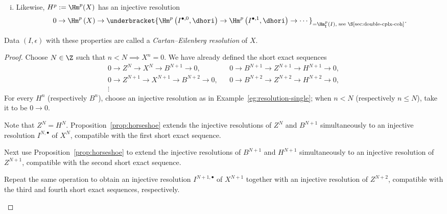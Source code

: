 \begin{theorem}
\begin{enumerate}[(i)]
		\[ 0 \to \Image\left( d_X^p \right) \to \Image\left( \dhori^{p, 0} \right) \to \Image\left( \dhori^{p, 1} \right) \to \cdots . \]
		\item Likewise, $H^p:=\Hm^p(X)$ has an injective resolution
		\[ 0 \to \Hm^p\left(X\right) \to \underbracket{\Hm^p\left( I^{\bullet, 0}, \dhori \right) \to \Hm^p\left( I^{\bullet, 1}, \dhori \right) \to \cdots}_{= \Hm^p_{\mathrm{I}}\left( I \right), \;\text{see \S\ref{sec:double-cplx-coh}} } . \]
	\end{enumerate}
	Data $(I,\epsilon)$ with these properties are called a
	\emph{Cartan--Eilenberg resolution} of $X$.
\end{theorem}
\begin{proof}
	Choose $N\in\Z$ such that $n<N\implies X^n=0$. We have already defined
	the short exact sequences
	\begin{align*}
		0 \to Z^N \to X^N \to B^{N+1} \to 0, & & 0 \to B^{N+1} \to Z^{N+1} \to H^{N+1} \to 0, \\
		0 \to Z^{N+1} \to X^{N+1} \to B^{N+2} \to 0, & & 0 \to B^{N+2} \to Z^{N+2} \to H^{N+2} \to 0, \\
		\vdots & &
	\end{align*}
	For every $H^n$ (respectively $B^n$), choose an injective resolution as in
	Example~\ref{eg:resolution-single}; when $n<N$ (respectively $n\leq N$),
	take it to be $0\to0$.
	\begin{compactitem}
		\item Note that $Z^N=H^N$. Proposition~\ref{prop:horseshoe} extends
		the injective resolutions of $Z^N$ and $B^{N+1}$ simultaneously to an
		injective resolution $I^{N,\bullet}$ of $X^N$, compatible with the
		first short exact sequence.
		\item Next use Proposition~\ref{prop:horseshoe} to extend the
		injective resolutions of $B^{N+1}$ and $H^{N+1}$ simultaneously to an
		injective resolution of $Z^{N+1}$, compatible with the second short
		exact sequence.
		\item Repeat the same operation to obtain an injective resolution
		$I^{N+1,\bullet}$ of $X^{N+1}$ together with an injective resolution
		of $Z^{N+2}$, compatible with the third and fourth short exact
		sequences, respectively.
	\end{compactitem}


\end{proof}
